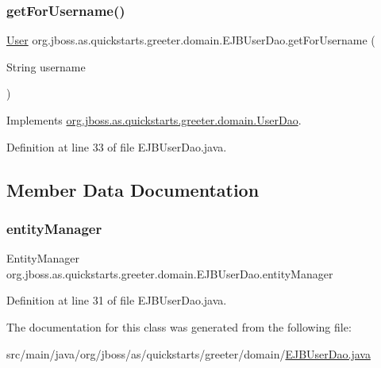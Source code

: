 \subsubsection{\texorpdfstring{get\+For\+Username()}{getForUsername()}}
{\footnotesize\ttfamily \hyperlink{classorg_1_1jboss_1_1as_1_1quickstarts_1_1greeter_1_1domain_1_1_user}{User} org.\+jboss.\+as.\+quickstarts.\+greeter.\+domain.\+E\+J\+B\+User\+Dao.\+get\+For\+Username (\begin{DoxyParamCaption}\item[{String}]{username }\end{DoxyParamCaption})}



Implements \hyperlink{interfaceorg_1_1jboss_1_1as_1_1quickstarts_1_1greeter_1_1domain_1_1_user_dao_a84aa70bdb1523236fcc24d2cd8b02b9f}{org.\+jboss.\+as.\+quickstarts.\+greeter.\+domain.\+User\+Dao}.



Definition at line 33 of file E\+J\+B\+User\+Dao.\+java.



\subsection{Member Data Documentation}
\mbox{\label{classorg_1_1jboss_1_1as_1_1quickstarts_1_1greeter_1_1domain_1_1_e_j_b_user_dao_a1735274f4e3efed8b472d1974a66ba34}} 
\subsubsection{\texorpdfstring{entity\+Manager}{entityManager}}
{\footnotesize\ttfamily Entity\+Manager org.\+jboss.\+as.\+quickstarts.\+greeter.\+domain.\+E\+J\+B\+User\+Dao.\+entity\+Manager\hspace{0.3cm}{\ttfamily [private]}}



Definition at line 31 of file E\+J\+B\+User\+Dao.\+java.



The documentation for this class was generated from the following file\+:\begin{DoxyCompactItemize}
\item 
src/main/java/org/jboss/as/quickstarts/greeter/domain/\hyperlink{_e_j_b_user_dao_8java}{E\+J\+B\+User\+Dao.\+java}\end{DoxyCompactItemize}
